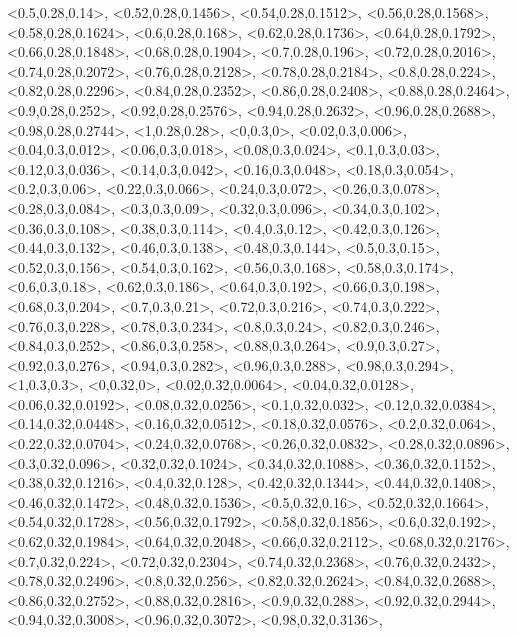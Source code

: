 \documentclass[a4paper,10pt]{article}
\begin{document}
\begin{eulernotebook}
\begin{euleroutput}
  <0.5,0.28,0.14>,
  <0.52,0.28,0.1456>,
  <0.54,0.28,0.1512>,
  <0.56,0.28,0.1568>,
  <0.58,0.28,0.1624>,
  <0.6,0.28,0.168>,
  <0.62,0.28,0.1736>,
  <0.64,0.28,0.1792>,
  <0.66,0.28,0.1848>,
  <0.68,0.28,0.1904>,
  <0.7,0.28,0.196>,
  <0.72,0.28,0.2016>,
  <0.74,0.28,0.2072>,
  <0.76,0.28,0.2128>,
  <0.78,0.28,0.2184>,
  <0.8,0.28,0.224>,
  <0.82,0.28,0.2296>,
  <0.84,0.28,0.2352>,
  <0.86,0.28,0.2408>,
  <0.88,0.28,0.2464>,
  <0.9,0.28,0.252>,
  <0.92,0.28,0.2576>,
  <0.94,0.28,0.2632>,
  <0.96,0.28,0.2688>,
  <0.98,0.28,0.2744>,
  <1,0.28,0.28>,
  <0,0.3,0>,
  <0.02,0.3,0.006>,
  <0.04,0.3,0.012>,
  <0.06,0.3,0.018>,
  <0.08,0.3,0.024>,
  <0.1,0.3,0.03>,
  <0.12,0.3,0.036>,
  <0.14,0.3,0.042>,
  <0.16,0.3,0.048>,
  <0.18,0.3,0.054>,
  <0.2,0.3,0.06>,
  <0.22,0.3,0.066>,
  <0.24,0.3,0.072>,
  <0.26,0.3,0.078>,
  <0.28,0.3,0.084>,
  <0.3,0.3,0.09>,
  <0.32,0.3,0.096>,
  <0.34,0.3,0.102>,
  <0.36,0.3,0.108>,
  <0.38,0.3,0.114>,
  <0.4,0.3,0.12>,
  <0.42,0.3,0.126>,
  <0.44,0.3,0.132>,
  <0.46,0.3,0.138>,
  <0.48,0.3,0.144>,
  <0.5,0.3,0.15>,
  <0.52,0.3,0.156>,
  <0.54,0.3,0.162>,
  <0.56,0.3,0.168>,
  <0.58,0.3,0.174>,
  <0.6,0.3,0.18>,
  <0.62,0.3,0.186>,
  <0.64,0.3,0.192>,
  <0.66,0.3,0.198>,
  <0.68,0.3,0.204>,
  <0.7,0.3,0.21>,
  <0.72,0.3,0.216>,
  <0.74,0.3,0.222>,
  <0.76,0.3,0.228>,
  <0.78,0.3,0.234>,
  <0.8,0.3,0.24>,
  <0.82,0.3,0.246>,
  <0.84,0.3,0.252>,
  <0.86,0.3,0.258>,
  <0.88,0.3,0.264>,
  <0.9,0.3,0.27>,
  <0.92,0.3,0.276>,
  <0.94,0.3,0.282>,
  <0.96,0.3,0.288>,
  <0.98,0.3,0.294>,
  <1,0.3,0.3>,
  <0,0.32,0>,
  <0.02,0.32,0.0064>,
  <0.04,0.32,0.0128>,
  <0.06,0.32,0.0192>,
  <0.08,0.32,0.0256>,
  <0.1,0.32,0.032>,
  <0.12,0.32,0.0384>,
  <0.14,0.32,0.0448>,
  <0.16,0.32,0.0512>,
  <0.18,0.32,0.0576>,
  <0.2,0.32,0.064>,
  <0.22,0.32,0.0704>,
  <0.24,0.32,0.0768>,
  <0.26,0.32,0.0832>,
  <0.28,0.32,0.0896>,
  <0.3,0.32,0.096>,
  <0.32,0.32,0.1024>,
  <0.34,0.32,0.1088>,
  <0.36,0.32,0.1152>,
  <0.38,0.32,0.1216>,
  <0.4,0.32,0.128>,
  <0.42,0.32,0.1344>,
  <0.44,0.32,0.1408>,
  <0.46,0.32,0.1472>,
  <0.48,0.32,0.1536>,
  <0.5,0.32,0.16>,
  <0.52,0.32,0.1664>,
  <0.54,0.32,0.1728>,
  <0.56,0.32,0.1792>,
  <0.58,0.32,0.1856>,
  <0.6,0.32,0.192>,
  <0.62,0.32,0.1984>,
  <0.64,0.32,0.2048>,
  <0.66,0.32,0.2112>,
  <0.68,0.32,0.2176>,
  <0.7,0.32,0.224>,
  <0.72,0.32,0.2304>,
  <0.74,0.32,0.2368>,
  <0.76,0.32,0.2432>,
  <0.78,0.32,0.2496>,
  <0.8,0.32,0.256>,
  <0.82,0.32,0.2624>,
  <0.84,0.32,0.2688>,
  <0.86,0.32,0.2752>,
  <0.88,0.32,0.2816>,
  <0.9,0.32,0.288>,
  <0.92,0.32,0.2944>,
  <0.94,0.32,0.3008>,
  <0.96,0.32,0.3072>,
  <0.98,0.32,0.3136>,

\end{euleroutput}
\end{eulernotebook}
\end{document}
